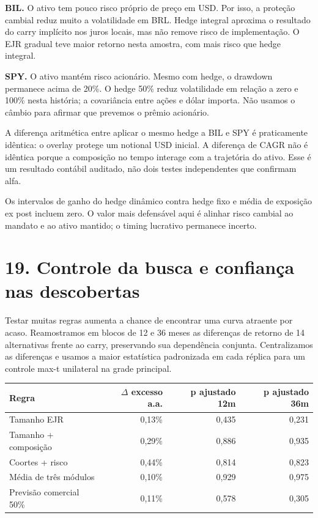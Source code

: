\documentclass[11pt,a4paper]{article}
\begin{document}
\textbf{BIL.} O ativo tem pouco risco próprio de preço em USD. Por isso, a proteção cambial reduz muito a volatilidade em BRL. Hedge integral aproxima o resultado do carry implícito nos juros locais, mas não remove risco de implementação. O EJR gradual teve maior retorno nesta amostra, com mais risco que hedge integral.

\textbf{SPY.} O ativo mantém risco acionário. Mesmo com hedge, o drawdown permanece acima de 20\%. O hedge 50\% reduz volatilidade em relação a zero e 100\% nesta história; a covariância entre ações e dólar importa. Não usamos o câmbio para afirmar que prevemos o prêmio acionário.

A diferença aritmética entre aplicar o mesmo hedge a BIL e SPY é praticamente idêntica: o overlay protege um notional USD inicial. A diferença de CAGR não é idêntica porque a composição no tempo interage com a trajetória do ativo. Esse é um resultado contábil auditado, não dois testes independentes que confirmam alfa.

Os intervalos de ganho do hedge dinâmico contra hedge fixo e média de exposição ex post incluem zero. O valor mais defensável aqui é alinhar risco cambial ao mandato e ao ativo mantido; o timing lucrativo permanece incerto.

\clearpage
\section*{19. Controle da busca e confiança nas descobertas}

Testar muitas regras aumenta a chance de encontrar uma curva atraente por acaso. Reamostramos em blocos de 12 e 36 meses as diferenças de retorno de 14 alternativas frente ao carry, preservando sua dependência conjunta. Centralizamos as diferenças e usamos a maior estatística padronizada em cada réplica para um controle max-t unilateral na grade principal.
\small\begin{center}\begin{tabular}{lrrr}\toprule Regra & $\Delta$ excesso a.a. & p ajustado 12m & p ajustado 36m\\\midrule 
Tamanho EJR & 0,13\% & 0,435 & 0,231\\
Tamanho + composição & 0,29\% & 0,886 & 0,935\\
Coortes + risco & 0,44\% & 0,814 & 0,823\\
Média de três módulos & 0,10\% & 0,929 & 0,975\\
Previsão comercial 50\% & 0,11\% & 0,578 & 0,305\\\bottomrule\end{tabular}\end{center}\normalsize
\end{document}
